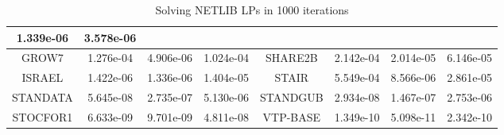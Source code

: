 \documentclass{article}
\newcommand{\0}{\textbf{0}}
\begin{document}
\begin{table}[h]
{{\begin{tabular}{cccc|c|ccc}
    1.339e-06 & 3.578e-06\\
    \hline
    GROW7 & 1.276e-04 & 4.906e-06 & 1.024e-04 & SHARE2B & 2.142e-04 &
    2.014e-05 & 6.146e-05\\
    \hline
    ISRAEL & 1.422e-06 & 1.336e-06 & 1.404e-05 & STAIR & 5.549e-04 & 8.566e-06
    & 2.861e-05\\
    \hline
    STANDATA & 5.645e-08 & 2.735e-07 & 5.130e-06 & STANDGUB & 2.934e-08 &
    1.467e-07 & 2.753e-06\\
    \hline
    STOCFOR1 & 6.633e-09 & 9.701e-09 & 4.811e-08 & VTP-BASE & 1.349e-10 &
    5.098e-11 & 2.342e-10\\
    \hline
  \end{tabular}}}
  \caption{Solving NETLIB LPs in 1000 iterations}
\end{table}



\end{document}
